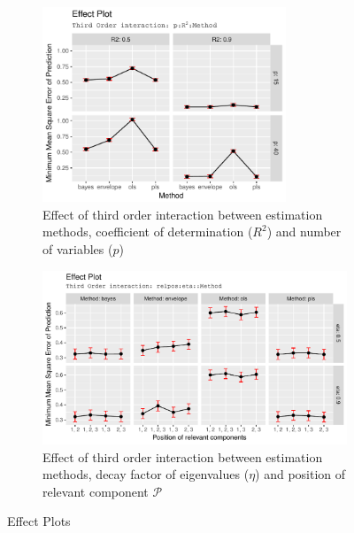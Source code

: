 \documentclass[a4paper, 11pt]{article}
\begin{document}
\begin{figure}[!ht]
  \centering
  \begin{subfigure}[t]{\textwidth}
    \centering
    \includegraphics[width=0.8\textwidth]{eff-plot-min}
    \caption[Effect Plot]{Effect of third order interaction between estimation methods,
      coefficient of determination ($R^2$) and number of variables ($p$)}
    \label{fig:effect-plot-pr2m}
  \end{subfigure}
  \begin{subfigure}[t]{\textwidth}
    \centering
    \includegraphics[width=\textwidth]{pdf/eff-plot-min-rgm} 
    \caption[Effect Plot: relpos, eta, method]{Effect of third order interaction
      between estimation methods, decay factor of eigenvalues ($\eta$) and
      position of relevant component $\mathcal{P}$}
    \label{fig:effect-plot-rgm}
  \end{subfigure}
  \caption{Effect Plots}
  \label{fig:effect-plot}
\end{figure}
\end{document}
